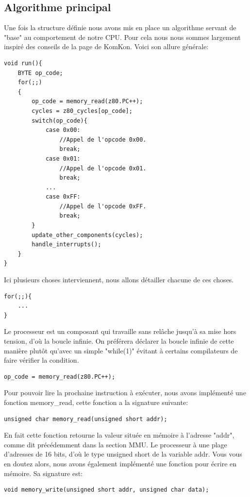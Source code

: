 \documentclass{report}
\begin{document}
\subsection{Algorithme principal}
Une fois la structure définie nous avons mis en place un algorithme servant de "base" au comportement de notre CPU. Pour cela nous nous sommes largement inspiré des conseils de la page de KomKon\cite{komkon}. Voici son allure générale:
 \begin{lstlisting}
void run(){
	BYTE op_code;
	for(;;)
	{
		op_code = memory_read(z80.PC++);
		cycles = z80_cycles[op_code];
		switch(op_code){	
			case 0x00:
				//Appel de l'opcode 0x00.
				break;
			case 0x01:
				//Appel de l'opcode 0x01.
				break;
			...
			case 0xFF:
				//Appel de l'opcode 0xFF.
				break;
		}
		update_other_components(cycles);
		handle_interrupts();
	}
}
 \end{lstlisting}		
Ici plusieurs choses interviennent, nous allons détailler chacune de ces choses.
\begin{lstlisting}
for(;;){
	...
}
\end{lstlisting}
Le processeur est un composant qui travaille sans relâche jusqu'à sa mise hors tension, d'où la boucle infinie. On préférera déclarer la boucle infinie de cette manière plutôt qu'avec un simple "while(1)" évitant à certains compilateurs de faire vérifier la condition.
\begin{lstlisting}
op_code = memory_read(z80.PC++);
\end{lstlisting}
Pour pouvoir lire la prochaine instruction à exécuter, nous avons implémenté une fonction memory\_read, cette fonction a la signature suivante:
\begin{lstlisting}
unsigned char memory_read(unsigned short addr);
\end{lstlisting}
En fait cette fonction retourne la valeur située en mémoire à l'adresse "addr", comme dit précédemment dans la section MMU. Le processeur à une plage d'adresses de 16 bits, d'où le type unsigned short de la variable addr.
Vous vous en doutez alors, nous avons également implémenté une fonction pour écrire en mémoire. Sa signature est:
\begin{lstlisting}
void memory_write(unsigned short addr, unsigned char data);
\end{lstlisting}
\end{document}
